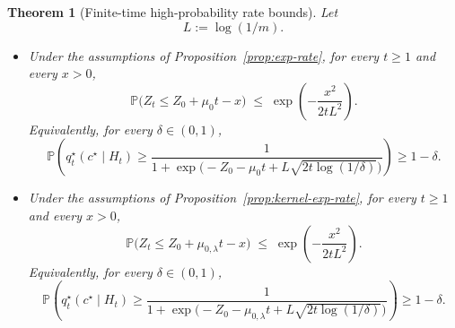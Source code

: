 \documentclass[11pt]{article}
\newtheorem{theorem}{Theorem}[section]
\theoremstyle{definition}
\theoremstyle{remark}
\newcommand{\Prob}{\mathbb{P}}
\begin{document}
\begin{theorem}[Finite-time high-probability rate bounds]
\label{thm:exp-rate-concentration}
Let
\[
L:=\log(1/m).
\]
\begin{itemize}
\item[(i)] Under the assumptions of Proposition~\ref{prop:exp-rate}, for every $t\ge 1$ and every $x>0$,
\[
\Prob\!\bigl(Z_t\le Z_0+\mu_0 t-x\bigr)
\;\le\;
\exp\!\left(-\frac{x^2}{2tL^2}\right).
\]
Equivalently, for every $\delta\in(0,1)$,
\[
\Prob\!\left(
q_t^\star(c^\star\mid H_t)\ge
\frac{1}{1+\exp\!\bigl(-Z_0-\mu_0 t+L\sqrt{2t\log(1/\delta)}\bigr)}
\right)\ge 1-\delta.
\]
\item[(ii)] Under the assumptions of Proposition~\ref{prop:kernel-exp-rate}, for every $t\ge 1$ and every $x>0$,
\[
\Prob\!\bigl(Z_t\le Z_0+\mu_{0,\lambda} t-x\bigr)
\;\le\;
\exp\!\left(-\frac{x^2}{2tL^2}\right).
\]
Equivalently, for every $\delta\in(0,1)$,
\[
\Prob\!\left(
q_t^\star(c^\star\mid H_t)\ge
\frac{1}{1+\exp\!\bigl(-Z_0-\mu_{0,\lambda} t+L\sqrt{2t\log(1/\delta)}\bigr)}
\right)\ge 1-\delta.
\]
\end{itemize}
\end{theorem}
\end{document}
